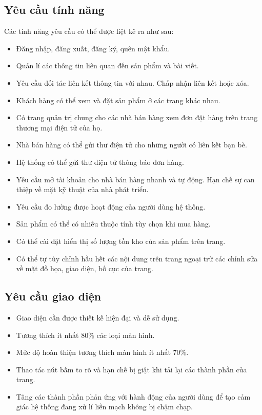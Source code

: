 \subsection{Yêu cầu tính năng}
Các tính năng yêu cầu có thể được liệt kê ra như sau:
\begin{itemize}
	\item Đăng nhập, đăng xuất, đăng ký, quên mật khẩu.
	\item Quản lí các thông tin liên quan đến sản phẩm và bài viết.
	\item Yêu cầu đối tác liên kết thông tin với nhau. Chấp nhận liên kết hoặc xóa.
	\item Khách hàng có thể xem và đặt sản phẩm ở các trang khác nhau.
	\item Có trang quản trị chung cho các nhà bán hàng xem đơn đặt hàng trên trang thương mại điện tử của họ.
	\item Nhà bán hàng có thể gửi thư điện tử cho những người có liên kết bạn bè.
	\item Hệ thống có thể gửi thư điện tử thông báo đơn hàng.
	\item Yêu cầu mở tài khoản cho nhà bán hàng nhanh và tự động. Hạn chế sự can thiệp về mặt kỹ thuật của nhà phát triển.
	\item Yêu cầu đo lường được hoạt động của người dùng hệ thống.
	\item Sản phẩm có thể có nhiều thuộc tính tùy chọn khi mua hàng.
	\item Có thể cài đặt hiển thị số lượng tồn kho của sản phẩm trên trang.
	\item Có thể tự tùy chỉnh hầu hết các nội dung trên trang ngoại trừ các chỉnh sửa về mặt đồ họa, giao diện, bố cục của trang.
\end{itemize}
\subsection{Yêu cầu giao diện}
\begin{itemize}
	\item Giao diện cần được thiết kế hiện đại và dễ sử dụng.
	\item Tương thích ít nhất 80\% các loại màn hình.
	\item Mức độ hoàn thiện tương thích màn hình ít nhất 70\%.
	\item Thao tác nút bấm to rõ và hạn chế bị giật khi tải lại các thành phần của trang.
	\item Tăng các thành phần phản ứng với hành động của người dùng để tạo cảm giác hệ thống đang xử lí liền mạch không bị chậm chạp.
\end{itemize}
